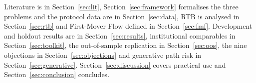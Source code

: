 Literature is in Section~\ref{sec:lit}, Section~\ref{sec:framework} formalises the three problems and the protocol data are in Section~\ref{sec:data}, RTB is analysed in Section~\ref{sec:rtb} and First-Mover Flow defined in Section~\ref{sec:fmf}. Development and holdout results are in Section~\ref{sec:results}, institutional comparables in Section~\ref{sec:toolkit}, the out-of-sample replication in Section~\ref{sec:oos}, the nine objections in Section~\ref{sec:objections} and generative path risk in Section~\ref{sec:generative}. Section~\ref{sec:discussion} covers practical use and Section~\ref{sec:conclusion} concludes.
